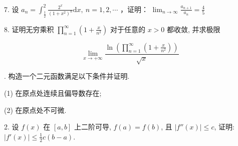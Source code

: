 \documentclass{examcollection}
\renewcommand{\displayformula}[1]{\[#1\]}
\begin{document}
{\begin{minipage}{\textwidth}
7. 设  $a_{n}=\int_{\frac{1}{2}}^{2}\frac{2^{x}}{(1+x^{2})^{n}}\mathrm{d}x,\ n=1,2,\cdots$ ，证明： $\lim_{n\to\infty}\frac{a_{n+1}}{a_{n}}=\frac{4}{5}$\par
8. 证明无穷乘积 $\prod_{n=1}^{\infty}\left(1 + \frac{x}{n^2}\right)$ 对于任意的 $x > 0$ 都收敛, 并求极限\par
\displayformula{\lim _ {x \rightarrow + \infty} \frac {\ln \left(\prod_ {n = 1} ^ {\infty} \left(1 + \frac {x}{n ^ {2}}\right)\right)}{\sqrt {x}}}\par
{}. 构造一个二元函数满足以下条件并证明.\par
(1) 在原点处连续且偏导数存在;\par
(2) 在原点处不可微.\par
2. 设 $f(x)$ 在 $[a, b]$ 上二阶可导, $f(a) = f(b)$, 且 $|f''(x)| \leq c$, 证明: $|f'(x)| \leq \frac{1}{2} c (b - a)$.\par
\end{minipage}}
\ifdim\dimexpr\ht\proofbox+\dp\proofbox\relax>\textheight
\noindent\resizebox{!}{\textheight}{\usebox{\proofbox}}\else\noindent\usebox{\proofbox}\fi\clearpage
\end{document}
